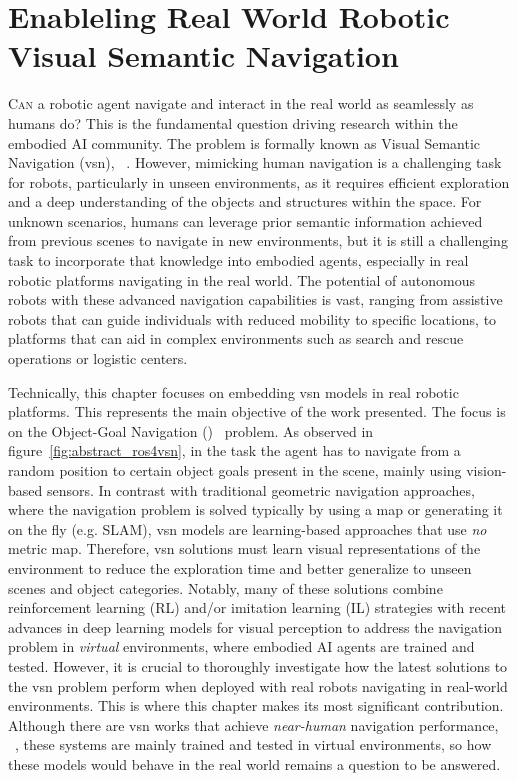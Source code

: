 \chapter{Enableling Real World Robotic Visual Semantic Navigation}\label{ch:ros4vsn:-enable-real-world-robotic-visual-semantic-navigation}

\lettrine{\textcolor{accent_color}{C}}{an} a robotic agent navigate and interact in the real world as seamlessly as humans do?
This is the fundamental question driving research within the embodied AI community.
The problem is formally known as Visual Semantic Navigation (\acrshort{vsn}), \eg~\cite{ramrakhya2023,Cai2024DGMemLV,chang2020}.
However, mimicking human navigation is a challenging task for robots, particularly in unseen environments, as it requires efficient exploration and a deep understanding of the objects and structures within the space.
For unknown scenarios, humans can leverage prior semantic information achieved from previous scenes to navigate in new environments, but it is still a challenging task to incorporate that knowledge into embodied agents, especially in real robotic platforms navigating in the real world.
The potential of autonomous robots with these advanced navigation capabilities is vast, ranging from assistive robots that can guide individuals with reduced mobility to specific locations, to platforms that can aid in complex environments such as search and rescue operations or logistic centers.

Technically, this chapter focuses on embedding \acrshort{vsn} models in real robotic platforms.
This represents the main objective of the work presented.
The focus is on the Object-Goal Navigation (\objnav)~\cite{batra2020} problem.
As observed in figure~\ref{fig:abstract_ros4vsn}, in the \objnav task the agent has to navigate from a random position to certain object goals present in the scene, mainly using vision-based sensors.
In contrast with traditional geometric navigation approaches, where the navigation problem is solved typically by using a map or generating it on the fly (e.g. SLAM), \acrshort{vsn} models are learning-based approaches that use \emph{no} metric map.
Therefore, \acrshort{vsn} solutions must learn visual representations of the environment to reduce the exploration time and better generalize to unseen scenes and object categories.
Notably, many of these solutions combine reinforcement learning (RL) and/or imitation learning (IL) strategies with recent advances in deep learning models for visual perception to address the navigation problem in \emph{virtual} environments, where embodied AI agents are trained and tested.
However, it is crucial to thoroughly investigate how the latest solutions to the \acrshort{vsn} problem perform when deployed with real robots navigating in real-world environments.
This is where this chapter makes its most significant contribution.
Although there are \acrshort{vsn} works that achieve \textit{near-human} navigation performance, \eg~\cite{ramrakhya2023}, these systems are mainly trained and tested in virtual environments, so how these models would behave in the real world remains a question to be answered.

